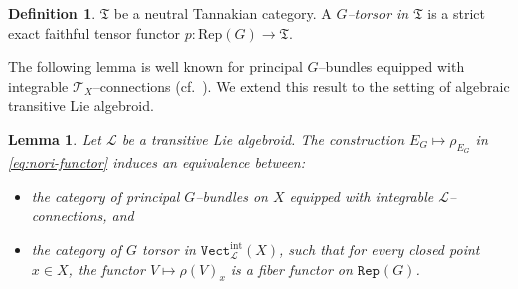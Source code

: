 \documentclass[12pt,reqno]{amsart}
\numberwithin{equation}{subsection}
\newtheorem{lem}[equation]{Lemma}
\theoremstyle{definition}
\newtheorem{defn}[equation]{Definition}
\theoremstyle{theorem}
\begin{document}
\begin{defn}
$\mathfrak{T}$ be a neutral Tannakian category. A \textit{$G$--torsor in $\mathfrak{T}$} is a strict exact faithful tensor functor $p:\text{Rep}(G)\rightarrow \mathfrak{T}$.
\end{defn}

The following lemma is well known for principal $G$--bundles equipped with
integrable $\mathcal{T}_{X}$--connections
(cf.~\cite[\S\,9, p.~55]{CT.Simpson-1995}). We extend this result to the setting of algebraic transitive Lie algebroid.


\begin{lem}\label{lem:PB-with-L-conection-Tannakian equivalence}
	Let $\mathcal{L}$ be a transitive Lie algebroid. The construction $E_{G}\longmapsto \rho_{E_{G}}$
	in \eqref{eq:nori-functor} induces an equivalence between:
	\begin{itemize}
		\item the category of principal $G$--bundles on $X$ equipped with integrable
		$\mathcal{L}$--connections, and
		\item the category of $G$ torsor in $\texttt{Vect}^{\text{int}}_{\mathcal{L}}(X)$,
		such that for every closed point $x\in X$, the functor
		$V\mapsto \rho(V)_{x}$ is a fiber functor on $\texttt{Rep}(G)$.
	\end{itemize}
\end{lem}
\end{document}
